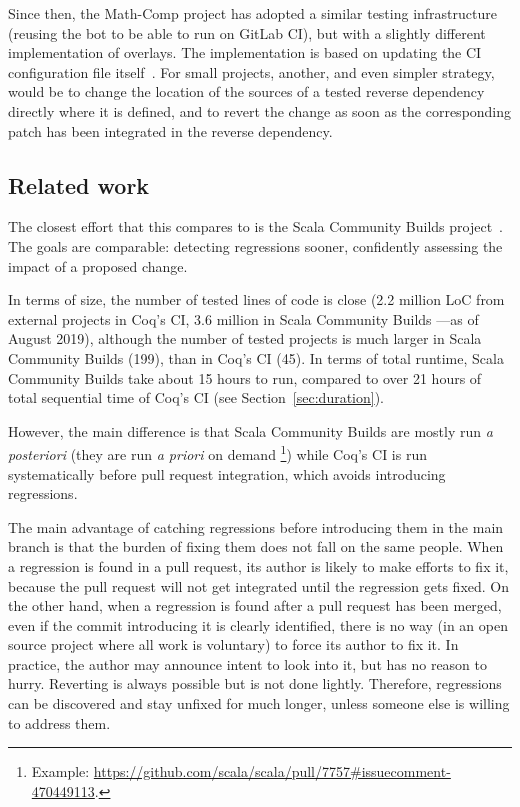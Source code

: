 Since then, the Math-Comp project has adopted a similar testing infrastructure (reusing the bot to be able to run on GitLab CI), but with a slightly different implementation of overlays. The implementation is based on updating the CI configuration file itself~\cite{martindorel2019overlays}.
For small projects, another, and even simpler strategy, would be to change the location of the sources of a tested reverse dependency directly where it is defined, and to revert the change as soon as the corresponding patch has been integrated in the reverse dependency.

\subsection{Related work}

The closest effort that this compares to is the Scala Community Builds project~\cite{tisue2018scala}.
The goals are comparable: detecting regressions sooner, confidently assessing the impact of a proposed change.

In terms of size, the number of tested lines of code is close (2.2 million LoC from external projects in Coq's CI, 3.6 million in Scala Community Builds ---as of August 2019), although the number of tested projects is much larger in Scala Community Builds (199), than in Coq's CI (45).
In terms of total runtime, Scala Community Builds take about 15 hours to run, compared to over 21 hours of total sequential time of Coq's CI (see Section~\ref{sec:duration}).

However, the main difference is that Scala Community Builds are mostly run \emph{a posteriori} (they are run \emph{a priori} on demand%
\footnote{
	Example: \url{https://github.com/scala/scala/pull/7757\#issuecomment-470449113}.
})
while Coq's CI is run systematically before pull request integration, which avoids introducing regressions.

The main advantage of catching regressions before introducing them in the main branch is that the burden of fixing them does not fall on the same people.
When a regression is found in a pull request, its author is likely to make efforts to fix it, because the pull request will not get integrated until the regression gets fixed.
On the other hand, when a regression is found after a pull request has been merged, even if the commit introducing it is clearly identified, there is no way (in an open source project where all work is voluntary) to force its author to fix it.
In practice, the author may announce intent to look into it, but has no reason to hurry.
Reverting is always possible but is not done lightly.
Therefore, regressions can be discovered and stay unfixed for much longer, unless someone else is willing to address them.

